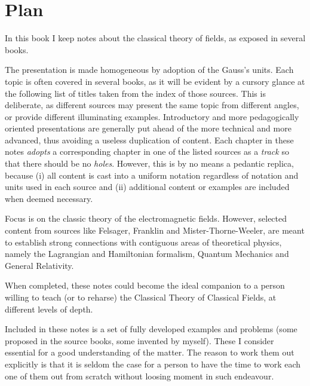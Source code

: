 \chapter*{Plan}
\label{plan} 

In this book I keep notes about the classical theory of fields, as exposed in several books. 

The presentation is made homogeneous by adoption of the Gauss's units. 
Each topic is often covered in several books, as it will be evident by a cursory glance at the following list of titles taken from the index of those sources. This is deliberate, as different sources may present the same topic from different angles, or provide different illuminating examples. Introductory and more pedagogically oriented presentations are generally put ahead of the more technical and more advanced, thus avoiding a useless duplication of content. Each chapter in these notes \textit{adopts} a corresponding chapter in one of the listed sources as a \textit{track} so that there should be no \textit{holes}. However, this is by no means a pedantic replica, because (i) all content is cast into a uniform notation regardless of notation and units used in each source and (ii) additional content or examples are included when deemed necessary. 

Focus is on the classic theory of the electromagnetic fields. However, selected content from sources like Felsager, Franklin and Mister-Thorne-Weeler, are meant to establish strong connections with contiguous areas of theoretical physics, namely the Lagrangian and Hamiltonian formalism, Quantum Mechanics and General Relativity. 

When completed, these notes could become the ideal companion to a person willing to teach (or to reharse) the Classical Theory of Classical Fields, at different levels of depth. 

Included in these notes is a set of fully developed examples and problems (some proposed in the source books, some invented by myself). These I consider essential for a good understanding of the matter. The reason to work them out explicitly is that it is seldom the case for a person to have the time to work each one of them out from scratch without loosing moment in such endeavour.        


